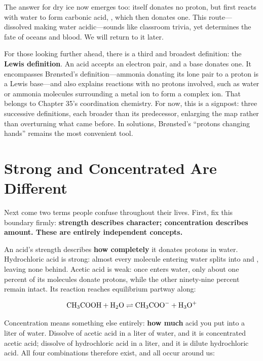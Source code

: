 The answer for dry ice now emerges too:  itself donates no proton, but first reacts with water to form carbonic acid, , which then donates one. This route---dissolved  making water acidic---sounds like classroom trivia, yet determines the fate of oceans and blood. We will return to it later.

For those looking further ahead, there is a third and broadest definition: the \textbf{Lewis definition}. An acid accepts an electron pair, and a base donates one. It encompasses Brønsted's definition---ammonia donating its lone pair to a proton is a Lewis base---and also explains reactions with no protons involved, such as water or ammonia molecules surrounding a metal ion to form a complex ion. That belongs to Chapter 35's coordination chemistry. For now, this is a signpost: three successive definitions, each broader than its predecessor, enlarging the map rather than overturning what came before. In solutions, Brønsted's ``protons changing hands'' remains the most convenient tool.

\section{Strong and Concentrated Are Different}

Next come two terms people confuse throughout their lives. First, fix this boundary firmly: \textbf{strength describes character; concentration describes amount. These are entirely independent concepts.}

An acid's strength describes \textbf{how completely} it donates protons in water. Hydrochloric acid is strong: almost every  molecule entering water splits into  and , leaving none behind. Acetic acid is weak: once  enters water, only about one percent of its molecules donate protons, while the other ninety-nine percent remain intact. Its reaction reaches equilibrium partway along:

\[\mathrm{CH_3COOH} + \mathrm{H_2O} \rightleftharpoons \mathrm{CH_3COO^-} + \mathrm{H_3O^+}\]

Concentration means something else entirely: \textbf{how much} acid you put into a liter of water. Dissolve  of acetic acid in a liter of water, and it is concentrated acetic acid; dissolve  of hydrochloric acid in a liter, and it is dilute hydrochloric acid. All four combinations therefore exist, and all occur around us:

